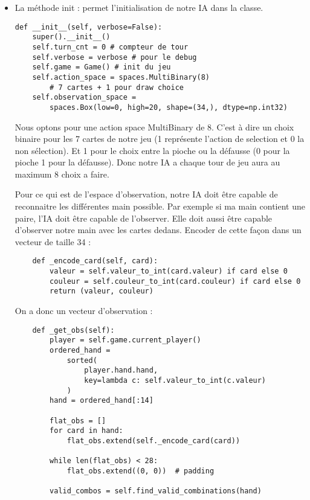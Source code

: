 \documentclass[a4paper,12pt]{article}
\begin{document}
\begin{itemize}
    \item La méthode init : permet l'initialisation de notre IA dans la classe.

\begin{verbatim}
def __init__(self, verbose=False):
    super().__init__()
    self.turn_cnt = 0 # compteur de tour
    self.verbose = verbose # pour le debug
    self.game = Game() # init du jeu
    self.action_space = spaces.MultiBinary(8) 
        # 7 cartes + 1 pour draw choice
    self.observation_space =
        spaces.Box(low=0, high=20, shape=(34,), dtype=np.int32)
\end{verbatim}

Nous optons pour une action space MultiBinary de 8. C'est à dire un choix binaire pour les 7 cartes de notre jeu (1 représente l'action de selection et 0 la non sélection). Et 1 pour le choix entre la pioche ou la défausse (0 pour la pioche 1 pour la défausse). Donc notre IA a chaque tour de jeu aura au maximum 8 choix a faire.

Pour ce qui est de l'espace d'observation, notre IA doit être capable de reconnaitre les différentes main possible. Par exemple si ma main contient une paire, l'IA doit être capable de l'observer. Elle doit aussi être capable d'observer notre main avec les cartes dedans. Encoder de cette façon dans un vecteur de taille 34 : 

\begin{verbatim}
    def _encode_card(self, card):
        valeur = self.valeur_to_int(card.valeur) if card else 0
        couleur = self.couleur_to_int(card.couleur) if card else 0
        return (valeur, couleur)
\end{verbatim}

On a donc un vecteur d'observation : 

\begin{verbatim}
    def _get_obs(self):
        player = self.game.current_player()
        ordered_hand =
            sorted(
                player.hand.hand,
                key=lambda c: self.valeur_to_int(c.valeur)
            )
        hand = ordered_hand[:14]

        flat_obs = []
        for card in hand:
            flat_obs.extend(self._encode_card(card))

        while len(flat_obs) < 28:
            flat_obs.extend((0, 0))  # padding

        valid_combos = self.find_valid_combinations(hand)


\end{verbatim}
\end{itemize}
\end{document}
